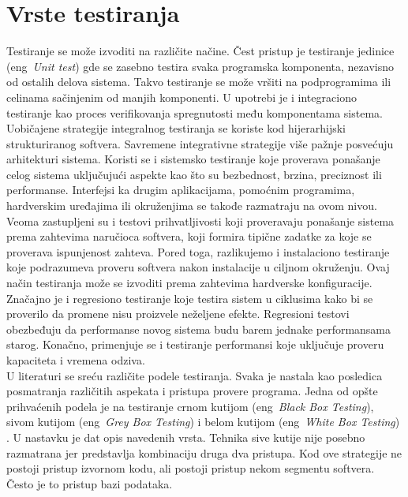 \documentclass[a4paper]{article}
\begin{document}
{\section{Vrste testiranja}
\label{sec:vrste_testiranja}
Testiranje se može izvoditi na različite načine. Čest pristup je testiranje jedinice (eng~{\em Unit test}) gde se zasebno testira svaka programska 
komponenta, nezavisno od ostalih delova sistema. Takvo testiranje se može vršiti na podprogramima ili celinama sačinjenim od manjih komponenti.
U upotrebi je i integraciono testiranje kao proces verifikovanja spregnutosti među komponentama sistema. Uobičajene strategije integralnog testiranja se koriste kod hijerarhijski strukturiranog softvera. Savremene integrativne strategije više pažnje posvećuju arhitekturi sistema. Koristi se i sistemsko testiranje koje proverava ponašanje celog sistema uključujući aspekte kao što su bezbednost, brzina, preciznost ili performanse. Interfejsi ka drugim aplikacijama, pomoćnim programima, hardverskim uređajima ili okruženjima se takođe razmatraju na ovom nivou.
Veoma zastupljeni su i testovi prihvatljivosti koji proveravaju ponašanje sistema prema zahtevima naručioca softvera, koji formira tipične zadatke za koje se proverava ispunjenost zahteva. Pored toga, razlikujemo i instalaciono testiranje koje podrazumeva proveru softvera 
nakon instalacije u ciljnom okruženju. Ovaj način testiranja može se izvoditi prema zahtevima hardverske konfiguracije. Značajno je i regresiono testiranje koje testira sistem u ciklusima kako bi se proverilo da promene
nisu proizvele neželjene efekte. Regresioni testovi obezbeđuju da performanse novog sistema budu barem jednake performansama starog.
Konačno, primenjuje se i testiranje performansi koje uključuje proveru kapaciteta i vremena odziva. \\

U literaturi se sreću različite podele testiranja. Svaka je nastala kao posledica posmatranja različitih aspekata i pristupa provere programa. Jedna od opšte prihvaćenih podela je na testiranje crnom kutijom (eng~{\em Black Box Testing}), sivom kutijom (eng~{\em Grey Box Testing}) i belom kutijom (eng~{\em White Box Testing}) \cite{fuzzing}. U nastavku je dat opis navedenih vrsta. Tehnika sive kutije nije posebno razmatrana jer predstavlja kombinaciju druga dva pristupa. Kod ove strategije ne postoji pristup izvornom kodu, ali postoji pristup nekom segmentu softvera. Često je to pristup bazi podataka.

}
\end{document}
